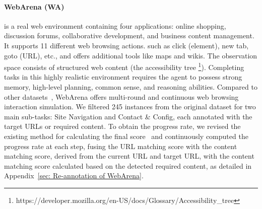 \paragraph{WebArena (WA)~\citep{zhou2023webarena}}
is a real web environment containing four applications: online shopping, discussion forums, collaborative development, and business content management. It supports 11 different web browsing actions. 
such as click (element),  new tab, goto (URL), etc., and offers additional tools like maps and wikis. 
The observation space consists of structured web content
(the accessibility tree
\footnote{https://developer.mozilla.org/en-US/docs/Glossary/Accessibility\_tree}). Completing tasks in this highly realistic environment requires the agent to possess strong memory, high-level planning, common sense, and reasoning abilities.
Compared to other datasets~\citep{deng2023mind2web,shi2017world}, WebArena offers multi-round and continuous web browsing interaction simulation. We filtered 245 instances from the original dataset for two main sub-tasks: Site Navigation and Contact \& Config, each annotated with the target URLs or required content. 
To obtain the progress rate, we revised the existing method for calculating the final score~\citep{zhou2023webarena} and continuously computed the progress rate at each step, fusing the URL matching score with the content matching score, 
derived from the current URL and target URL, with the content matching score calculated based on the detected required content, 
as detailed in Appendix~\ref{sec: Re-annotation of WebArena}.




